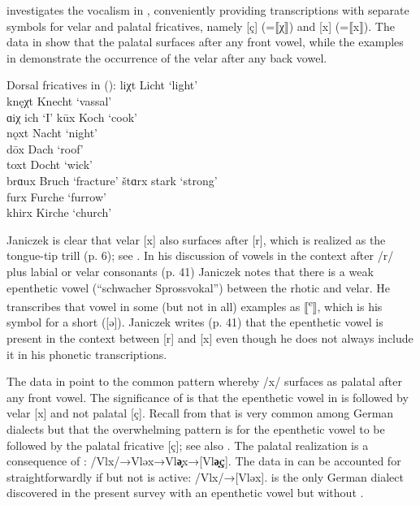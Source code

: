 {\citet{Janiczek1911} investigates the vocalism in , conveniently providing transcriptions with separate symbols for velar and palatal fricatives, namely [ç] (=⟦χ⟧) and [x] (=⟦x⟧). The data in  show that the palatal surfaces after any front vowel, while the examples in  demonstrate the occurrence of the velar after any back vowel.\largerpage

\ea%
\label{ex:15:5}Dorsal fricatives in  ():
\ea\label{ex:15:5a} liχt  \tab  [lɪçt] \tab Licht \tab ‘light’ \\
knęχt \tab [knɛçt] \tab Knecht \tab ‘vassal’ \\
ɑiχ  \tab  [ɑiç] \tab ich \tab ‘I’ 
\ex\label{ex:15:5b} kūx  \tab  [kuːx] \tab Koch \tab ‘cook’ \\
nǫxt \tab [nɔxt] \tab Nacht \tab ‘night’ \\
dōx  \tab  [doːx] \tab Dach \tab ‘roof’ \\
toxt  \tab  [tox] \tab Docht \tab ‘wick’ \\
brɑux \tab [brɑux] \tab Bruch \tab ‘fracture’ 
\ex\label{ex:15:5c} štɑrx \tab [ʃtɑrəx] \tab stark \tab ‘strong’ \\
furx \tab [fʊrəx] \tab Furche \tab ‘furrow’ \\
khirx \tab [kʰɪrəx] \tab Kirche \tab ‘church’ 
    \z
\z 

Janiczek is clear that velar [x] also surfaces after [r], which is realized as the tongue-tip trill (p. 6); see . In his discussion of vowels in the context after /r/ plus labial or velar consonants (p. 41) Janiczek notes that there is a weak epenthetic vowel (“schwacher Sprossvokal”) between the rhotic and velar. He transcribes that vowel in some (but not in all) examples as ⟦\textsuperscript{e}⟧, which is his symbol for a short  ([ə]). Janiczek writes (p. 41) that the epenthetic vowel is present in the context between [r] and [x] even though he does not always include it in his phonetic transcriptions.

The data in  point to the common pattern whereby /x/ surfaces as palatal after any front vowel. The significance of  is that the epenthetic vowel in  is followed by velar [x] and not palatal [ç]. Recall from  that  is very common among German dialects but that the overwhelming pattern is for the epenthetic vowel to be followed by the palatal fricative [ç]; see also . The palatal realization is a consequence of : /Vlx/→{\textbar}Vləx{\textbar}→{\textbar}Vl\textbf{ə̟}x{\textbar}→[Vl\textbf{ə̟ç}]. The data in  can be accounted for straightforwardly if  but not  is active: /Vlx/→[Vləx].  is the only German dialect discovered in the present survey with an epenthetic vowel but without .

}
